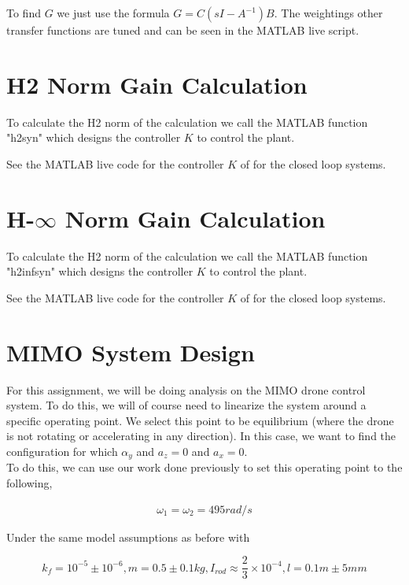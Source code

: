\documentclass{article}
\begin{document}
    To find $G$ we just use the formula $G = C(sI-A^{-1})B$.
    The weightings other transfer functions are tuned and can be seen in the MATLAB live
    script.

    \section{H2 Norm Gain Calculation}\label{sec:H2_Norm}

    To calculate the H2 norm of the calculation we call the MATLAB function "h2syn" which
    designs the controller $K$ to control the plant.

    See the MATLAB live code for the controller $K$ of for the closed loop systems.

    \section{H-$\infty$ Norm Gain Calculation}\label{sec:Hinf_Norm}

    To calculate the H2 norm of the calculation we call the MATLAB function "h2infsyn" which
    designs the controller $K$ to control the plant.

    See the MATLAB live code for the controller $K$ of for the closed loop systems.

    \section{MIMO System Design}\label{sec:MIMO_Design}

    For this assignment, we will be doing analysis on the MIMO drone control system.
    To do this, we will of course need to linearize the system around a specific operating point.
    We select this point to be equilibrium (where the drone is not rotating or accelerating in any direction).
    In this case, we want to find the configuration for which $\alpha_y$ and $a_z = 0$ and $a_x = 0$.
    \\
    To do this, we can use our work done previously to set this operating point to the following,

    \begin{align}
        \omega_1 = \omega_2 = 495 rad/s
    \end{align}

    Under the same model assumptions as before with

    \[ k_f = 10^{-5} \pm 10^{-6}, m = 0.5 \pm 0.1kg, I_{rod} \approx \frac{2}{3} \times 10^{-4}, l = 0.1m \pm 5mm\]
\end{document}
